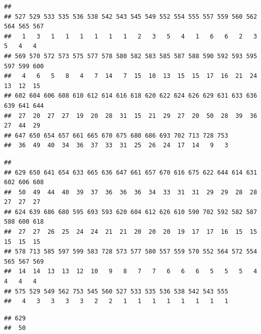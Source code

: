 \documentclass[
]{book}
\newenvironment{Shaded}{\begin{snugshade}}{\end{snugshade}}
\newcommand{\AttributeTok}[1]{\textcolor[rgb]{0.13,0.29,0.53}{#1}}
\newcommand{\CommentTok}[1]{\textcolor[rgb]{0.56,0.35,0.01}{\textit{#1}}}
\newcommand{\DecValTok}[1]{\textcolor[rgb]{0.00,0.00,0.81}{#1}}
\newcommand{\FunctionTok}[1]{\textcolor[rgb]{0.13,0.29,0.53}{\textbf{#1}}}
\newcommand{\NormalTok}[1]{#1}
\newcommand{\SpecialCharTok}[1]{\textcolor[rgb]{0.81,0.36,0.00}{\textbf{#1}}}
\begin{document}
\begin{verbatim}
## 
## 527 529 533 535 536 538 542 543 545 549 552 554 555 557 559 560 562 564 565 567 
##   1   3   1   1   1   1   1   1   2   3   5   4   1   6   6   2   3   5   4   4 
## 569 570 572 573 575 577 578 580 582 583 585 587 588 590 592 593 595 597 599 600 
##   4   6   5   8   4   7  14   7  15  10  13  15  15  17  16  21  24  13  12  15 
## 602 604 606 608 610 612 614 616 618 620 622 624 626 629 631 633 636 639 641 644 
##  27  20  27  27  19  20  28  31  15  21  29  27  20  50  28  39  36  27  44  29 
## 647 650 654 657 661 665 670 675 680 686 693 702 713 728 753 
##  36  49  40  34  36  37  33  31  25  26  24  17  14   9   3
\end{verbatim}

\begin{Shaded}
\end{Shaded}

\begin{verbatim}
## 
## 629 650 641 654 633 665 636 647 661 657 670 616 675 622 644 614 631 602 606 608 
##  50  49  44  40  39  37  36  36  36  34  33  31  31  29  29  28  28  27  27  27 
## 624 639 686 680 595 693 593 620 604 612 626 610 590 702 592 582 587 588 600 618 
##  27  27  26  25  24  24  21  21  20  20  20  19  17  17  16  15  15  15  15  15 
## 578 713 585 597 599 583 728 573 577 580 557 559 570 552 564 572 554 565 567 569 
##  14  14  13  13  12  10   9   8   7   7   6   6   6   5   5   5   4   4   4   4 
## 575 529 549 562 753 545 560 527 533 535 536 538 542 543 555 
##   4   3   3   3   3   2   2   1   1   1   1   1   1   1   1
\end{verbatim}

\begin{Shaded}
\end{Shaded}

\begin{verbatim}
## 629 
##  50
\end{verbatim}
\end{document}
